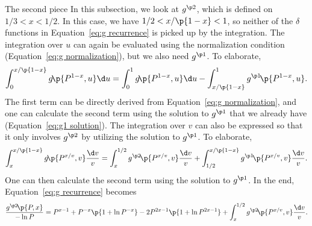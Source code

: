 \documentclass[oneside,12pt,final]{ucthesis-CA2012}
\newcommand{\dlt}{\delta}
\newcommand{\fr}{\frac}
\newcommand{\fc}[2]{#1\mathchoice{\!}{\!}{}{}\p{#2}} %
\begin{document}
\begin{mainmatter}
\begin{section}{The second piece}
In this subsection, we look at $g^{\p2}$, which is defined on $1/3<x<1/2$.
In this case, we have $1/2<x/\p{1-x}<1$, so neither of the $\dlt$ functions in Equation~\ref{eq:g recurrence}
is picked up by the integration.
The integration over $u$ can again be evaluated using the normalization condition (Equation~\ref{eq:g normalization}),
but we also need $g^{\p1}$. To elaborate,
\[\int_0^{x/\p{1-x}}\fc g{P^{1-x},u}\d u
=\int_0^1\fc g{P^{1-x},u}\d u-\int_{x/\p{1-x}}^1\fc{g^{\p1}}{P^{1-x},u}.\]
The first term can be directly derived from Equation~\ref{eq:g normalization},
and one can calculate the second term using the solution to $g^{\p1}$ that we already have (Equation~\ref{eq:g1 solution}).
The integration over $v$ can also be expressed so that it only involves $g^{\p2}$
by utilizing the solution to $g^{\p1}$. To elaborate,
\[\int_x^{x/\p{1-x}}\fc g{P^{x/v},v}\fr{\d v}v
=\int_x^{1/2}\fc{g^{\p2}}{P^{x/v},v}\fr{\d v}v
+\int_{1/2}^{x/\p{1-x}}\fc{g^{\p1}}{P^{x/v},v}\fr{\d v}v.\]
One can then calculate the second term using the solution to $g^{\p1}$.
In the end, Equation~\ref{eq:g recurrence} becomes
\begin{equation}
	\label{eq:g2 recurrence}
	\fr{\fc{g^{\p2}}{P,x}}{-\ln P}=P^{x-1}+P^{-x}\p{1+\ln P^{-x}}-2P^{2x-1}\p{1+\ln P^{2x-1}}
	+\int_x^{1/2}\fc{g^{\p2}}{P^{x/v},v}\fr{\d v}v.
\end{equation}


\end{section}
\end{mainmatter}
\end{document}
